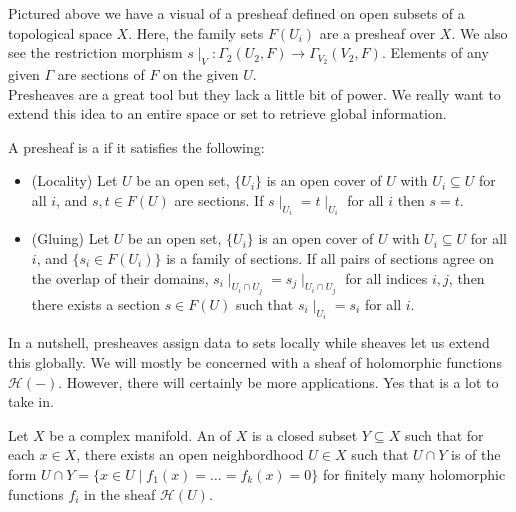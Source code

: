 Pictured above we have a visual of a presheaf defined on open subsets of a topological
space $X$. Here, the family sets $F(U_i)$ are a presheaf over $X$. We also see the restriction
morphism $s\mid_V: \Gamma_2(U_2,F) \to \Gamma_{V_2}(V_2,F)$. Elements of any given
$\Gamma$ are sections of $F$ on the given $U$.\\

Presheaves are a great tool but they lack a little bit of power. We really want 
to extend this idea to an entire space or set to retrieve global information.

\begin{definition}
    A presheaf is a  if it satisfies the following:
    \begin{itemize}
        \item (Locality) Let $U$ be an open set, $\{U_i\}$ is an open cover of $U$
        with $U_i \subseteq U$ for all $i$, and $s,t \in F(U)$ are sections. If
        $s\mid_{U_i} = t \mid_{U_i}$ for all $i$ then $s=t$.
        \item (Gluing) Let $U$ be an open set, $\{U_i\}$ is an open cover of $U$
        with $U_i \subseteq U$ for all $i$, and $\{s_i \in F(U_i)\}$ is a family
        of sections. If all pairs of sections agree on the overlap of their domains,
        $s_i\mid_{U_i\cap U_j} = s_j\mid_{U_i\cap U_j}$ for all indices $i,j$, then
        there exists a section $s\in F(U)$ such that $s_i\mid_{U_i} = s_i$ for all $i$.
    \end{itemize}
\end{definition}

In a nutshell, presheaves assign data to sets locally while sheaves let us extend
this globally. We will mostly be concerned with a sheaf of holomorphic functions
$\mathcal{H}(-)$. However, there will certainly be more applications. Yes that is
a lot to take in.

\begin{definition}
    Let $X$ be a complex manifold. An  of $X$ is a closed
    subset $Y \subseteq X$ such that for each $x \in X$, there exists an open neighbordhood
    $U \in X$ such that $U \cap Y$ is of the form 
    $U \cap Y = \{ x \in U \mid f_1(x) = \hdots = f_k(x) = 0\}$ for finitely many
    holomorphic functions $f_i$ in the sheaf $\mathcal{H}(U)$.
\end{definition}

